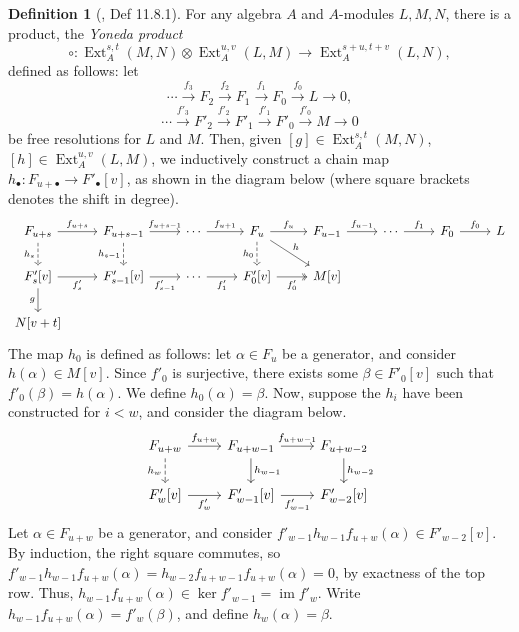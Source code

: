 \documentclass[11pt, titlepage]{article} %
\DeclareMathOperator{\Ext}{Ext}
\DeclareMathOperator{\im}{im}
\numberwithin{equation}{subsection}
\theoremstyle{plain}
\theoremstyle{definition}
\newtheorem{definition}[theorem]{Definition}
\begin{document}
\begin{definition}[\autocite{rognes2}, Def 11.8.1]\label{2505042248yeahiknow}
For any algebra \(A\) and \(A\)-modules \(L,M,N\), there is a product, the \textit{Yoneda product}
\[\circ : \Ext_A^{s,t}(M,N)\otimes \Ext^{u,v}_A(L,M)\to \Ext_A^{s+u, t+v}(L,N),\]
defined as follows: let 
\[\cdots \xrightarrow{f_3} F_2 \xrightarrow{f_2} F_1 \xrightarrow{f_1} F_0 \xrightarrow{f_0} L\to 0,\]
\[\cdots \xrightarrow{f'_3} F'_2 \xrightarrow{f'_2} F'_1 \xrightarrow{f'_1} F'_0 \xrightarrow{f'_0} M\to 0\]
be free resolutions for \(L\) and \(M\). Then, given \([g] \in \Ext_A^{s,t}(M, N)\), \([h]\in \Ext_A^{u,v}(L, M)\), we inductively construct a chain map \(h_\bullet : F_{u+\bullet} \to F'_{\bullet}[v]\), as shown in the diagram below (where square brackets denotes the shift in  degree).
\[\begin{tikzcd} 
F_{u+s} \arrow[r, "f_{u+s}"] \arrow[d, swap, "h_s", dashrightarrow]  & F_{u+s-1} \arrow[r, "f_{u+s-1}"] \arrow[d, "h_{s-1}"', dashrightarrow] & \cdots \arrow[r, "f_{u+1}"] & F_u \arrow[d, "h_0"', dashrightarrow] \arrow[dr, "h"] \arrow[r, "f_u"] & F_{u-1} \arrow[r, "f_{u-1}"] & \cdots \arrow[r, "f_1"] & F_0 \arrow[r, "f_0"] & L \\ 
F'_{s}[v] \arrow[r, swap, "f'_s"] \arrow[d, swap, "g"] & F'_{s-1}[v] \arrow[r, "f'_{s-1}"'] & \cdots \arrow[r, "f'_1"'] & F'_0[v] \arrow[r, "f'_0"', twoheadrightarrow] & M[v] & & & \\ 
N[v+t] & & & & & & & 
\end{tikzcd}\]
The map \(h_0\) is defined as follows: let \(\alpha \in F_u\) be a generator, and consider \(h(\alpha)\in M[v]\). Since \(f'_0\) is surjective, there exists some \(\beta\in F'_0[v]\) such that \(f'_0(\beta)=h(\alpha)\). We define \(h_0(\alpha)=\beta\). Now, suppose the \(h_i\) have been constructed for \(i<w\), and consider the diagram below.
\[\begin{tikzcd}
F_{u+w} \arrow[r, "f_{u+w}"] \arrow[d, swap, "h_w", dashrightarrow]  & F_{u+w-1} \arrow[r, "f_{u+w-1}"] \arrow[d, "h_{w-1}"] & F_{u+w-2} \arrow[d, "h_{w-2}"] \\ 
F'_w[v] \arrow[r, swap, "f'_w"]  & F'_{w-1}[v] \arrow[r, "f'_{w-1}"'] & F'_{w-2}[v] 
 \end{tikzcd}\] 
Let \(\alpha\in F_{u+w}\) be a generator, and consider \(f'_{w-1}h_{w-1}f_{u+w}(\alpha)\in F'_{w-2}[v]\). By induction, the right square commutes, so \(f'_{w-1}h_{w-1}f_{u+w}(\alpha)=h_{w-2}f_{u+w-1}f_{u+w}(\alpha)=0\), by exactness of the top row. Thus, \(h_{w-1}f_{u+w}(\alpha)\in \ker f'_{w-1}=\im f'_w\). Write \(h_{w-1}f_{u+w}(\alpha)=f'_w(\beta)\), and define \(h_w(\alpha)=\beta\).  


\end{definition}
\end{document}

